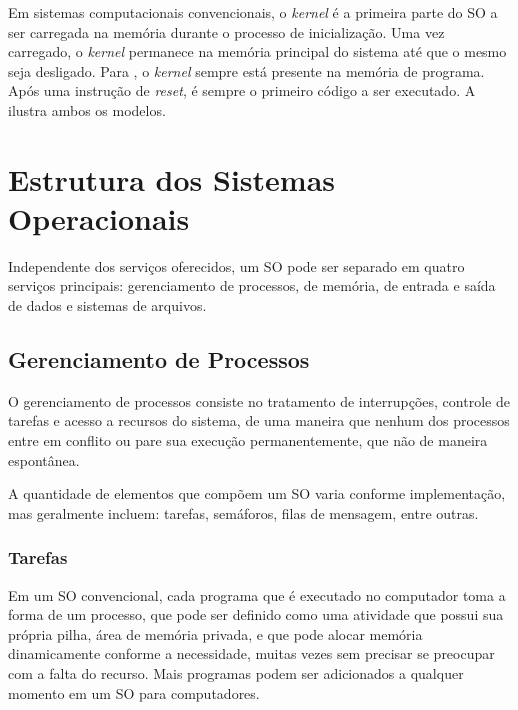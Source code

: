 
Em sistemas computacionais convencionais, o \emph{kernel} é a primeira parte do SO a ser carregada na memória durante o processo de inicialização. Uma vez carregado, o \emph{kernel} permanece na memória principal do sistema até que o mesmo seja desligado. Para , o \emph{kernel} sempre está presente na memória de programa. Após uma instrução de \emph{reset}, é sempre o primeiro código a ser executado. A  ilustra ambos os modelos.


\section{Estrutura dos Sistemas Operacionais}

Independente dos serviços oferecidos, um SO pode ser separado em quatro serviços principais: gerenciamento de processos, de memória, de entrada e saída de dados e sistemas de arquivos.

\subsection{Gerenciamento de Processos}

O gerenciamento de processos consiste no tratamento de interrupções, controle de tarefas e acesso a recursos do sistema, de uma maneira que nenhum dos processos entre em conflito ou pare sua execução permanentemente, que não de maneira espontânea.

A quantidade de elementos que compõem um SO varia conforme implementação, mas geralmente incluem: tarefas, semáforos, filas de mensagem, entre outras.

\subsubsection{Tarefas}

Em um SO convencional, cada programa que é executado no computador toma a forma de um processo, que pode ser definido como uma atividade que possui sua própria pilha, área de memória privada, e que pode alocar memória dinamicamente conforme a necessidade, muitas vezes sem precisar se preocupar com a falta do recurso. Mais programas podem ser adicionados a qualquer momento em um SO para computadores.

